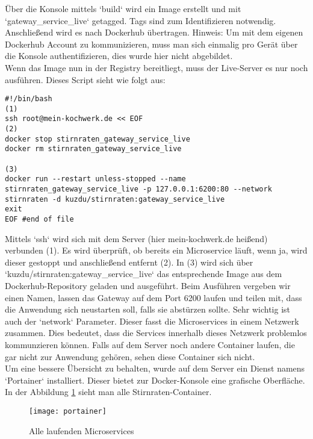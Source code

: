 Über die Konsole mittels `build` wird ein Image erstellt und mit `gateway\_service\_live` getagged. Tags sind zum Identifizieren notwendig. Anschließend wird es nach Dockerhub übertragen. Hinweis: Um mit dem eigenen Dockerhub Account zu kommunizieren, muss man sich einmalig pro Gerät über die Konsole authentifizieren, dies wurde hier nicht abgebildet. \\

Wenn das Image nun in der Registry bereitliegt, muss der Live-Server es nur noch ausführen. Dieses Script sieht wie folgt aus:

\begin{verbatim}
#!/bin/bash
(1)
ssh root@mein-kochwerk.de << EOF 
(2)
docker stop stirnraten_gateway_service_live
docker rm stirnraten_gateway_service_live

(3)
docker run --restart unless-stopped --name stirnraten_gateway_service_live -p 127.0.0.1:6200:80 --network stirnraten -d kuzdu/stirnraten:gateway_service_live
exit
EOF #end of file
\end{verbatim}
Mittels `ssh` wird sich mit dem Server (hier mein-kochwerk.de heißend) verbunden (1). Es wird überprüft, ob bereits ein Microservice läuft, wenn ja, wird dieser gestoppt und anschließend entfernt (2). In (3) wird sich über `kuzdu/stirnraten:gateway\_service\_live` das entsprechende Image aus dem Dockerhub-Repository geladen und ausgeführt. Beim Ausführen vergeben wir einen Namen, lassen das Gateway auf dem Port 6200 laufen und teilen mit, dass die Anwendung sich neustarten soll, falls sie abstürzen sollte. Sehr wichtig ist auch der `network` Parameter. Dieser fasst die Microservices in einem Netzwerk zusammen. Dies bedeutet, dass die Services innerhalb dieses Netzwerk problemlos kommunzieren können. Falls auf dem Server noch andere Container laufen, die gar nicht zur Anwendung gehören, sehen diese Container sich nicht.\\

Um eine bessere Übersicht zu behalten, wurde auf dem Server ein Dienst namens `Portainer` installiert. Dieser bietet zur Docker-Konsole eine grafische Oberfläche. In der Abbildung \ref{fig:portainer} sieht man alle Stirnraten-Container.

\begin{figure}[ht]
	\centering
	\texttt{[image: portainer]}
	\caption[Alle laufenden Microservices] {Alle laufenden Microservices}
	\label{fig:portainer}
\end{figure} 





